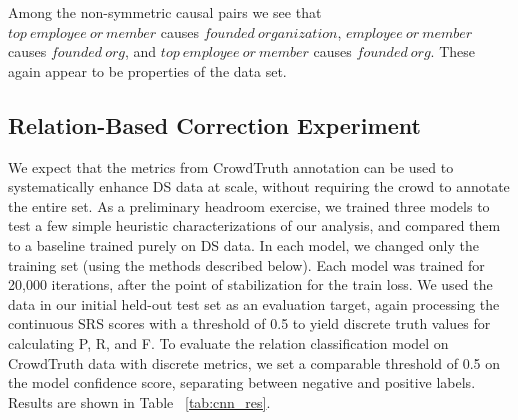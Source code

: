 Among the non-symmetric causal pairs we see that \\ $top\ employee\ or\ member$ causes $founded\ organization$, $employee\ or\ member$ causes $founded\ org$, and $top\ employee\ or\ member$ causes $founded\ org$.  These again appear to be properties of the data set.


\subsection{Relation-Based Correction Experiment}

We expect that the metrics from CrowdTruth annotation can be used to systematically enhance DS data at scale, without requiring the crowd to annotate the entire set.  As a preliminary headroom exercise, we trained three models to test a few simple heuristic characterizations of our analysis, and compared them to a baseline trained purely on DS data. In each model, we changed only the training set (using the methods described below). Each model was trained for 20,000 iterations, after the point of stabilization for the train loss. We used the data in our initial held-out test set as an evaluation target, again processing the continuous SRS scores with a threshold of 0.5 to yield discrete truth values for calculating P, R, and F. To evaluate the relation classification model on CrowdTruth data with discrete metrics, we set a comparable threshold of 0.5 on the model confidence score, separating between negative and positive labels. Results are shown in Table ~\ref{tab:cnn_res}.

